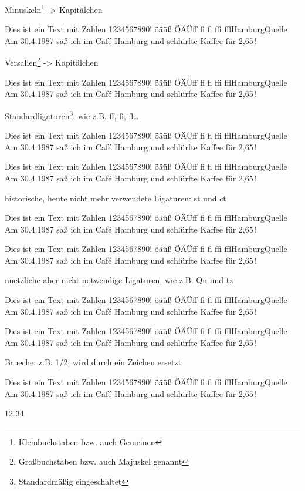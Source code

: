 \documentclass{fontdoku}
\def\TEXT{%
Dies ist ein Text mit Zahlen 1234567890!\newline%
öäüß ÖÄÜ\quad ff fi fl ffi ffl\quad Hamburg\quad Quelle\newline%
Am 30.4.1987 saß ich im \glqq{}Caf\'e Hamburg\grqq{} und schlürfte Kaffee für 2,65\,\libertineEuro!
}
\begin{document}

Minuskeln\footnote{Kleinbuchstaben bzw. auch Gemeinen} -> Kapitälchen

\begin{lstsample}[hpos=l,lstsize=0.4,codesize=0.4,toprule,bottomrule]
\TEXT
\end{lstsample}





Versalien\footnote{Großbuchstaben bzw. auch Majuskel genannt} -> Kapitälchen

\begin{lstsample}[hpos=l,lstsize=0.4,codesize=0.4,toprule,bottomrule]
\TEXT
\end{lstsample}



Standardligaturen\footnote{Standardmäßig eingeschaltet}, wie z.B. ff, fi, fl\dots

\begin{lstsample}[hpos=l,lstsize=0.4,codesize=0.4,toprule,bottomrule]
\TEXT

\TEXT
\end{lstsample}




historische, heute nicht mehr verwendete Ligaturen: st und ct

\begin{lstsample}[hpos=l,lstsize=0.4,codesize=0.4,toprule,bottomrule]
\TEXT

\TEXT
\end{lstsample}





nuetzliche aber nicht notwendige Ligaturen, wie z.B. Qu und tz

\begin{lstsample}[hpos=l,lstsize=0.4,codesize=0.4,toprule,bottomrule]
\TEXT

\TEXT
\end{lstsample}






Brueche: z.B. 1/2, wird durch ein Zeichen ersetzt

\begin{lstsample}[hpos=l,lstsize=0.4,codesize=0.4,toprule,bottomrule]
\TEXT

12 34
\end{lstsample}
\end{document}
